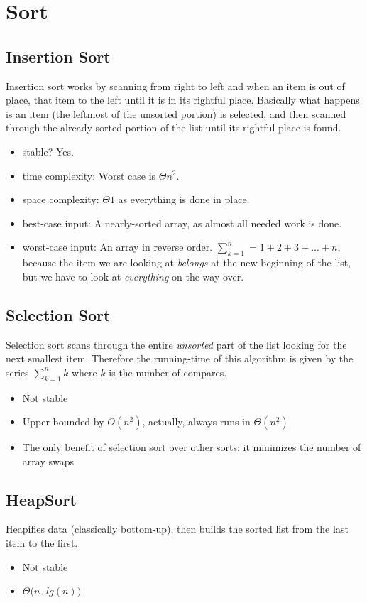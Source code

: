 \documentclass[12pt, letterpaper]{article}
\begin{document}
\section{Sort}
\subsection{Insertion Sort}
Insertion sort works by scanning from right to left and when an item is out of place,  that item to the left until it is in its rightful place.
\newline \newline \noindent
Basically what happens is an item (the leftmost of the unsorted portion) is selected, and then scanned through the already sorted portion of the list until its rightful place is found.
\begin{itemize}
\item stable? Yes.
\item time complexity:
Worst case is $\Theta n^2$.
\item space complexity: 
$\Theta 1$ as everything is done in place.
\item best-case input:
A nearly-sorted array, as almost all needed work is done. 
\item worst-case input: An array in reverse order. $\sum_{k=1}^{n} = 1 + 2 + 3 + ... + n$, because the item we are looking at \textit{belongs} at the new beginning of the list, but we have to look at \textit{everything} on the way over.
\end{itemize}
\subsection{Selection Sort}
Selection sort scans through the entire \emph{unsorted} part of the list looking for the next smallest item. Therefore the running-time of this algorithm is given by the series $\sum_{k=1}^n k$ where $k$ is the number of compares.
\begin{itemize}
\item Not stable
\item Upper-bounded by $O(n^2)$, actually, always runs in $\Theta(n^2)$
\item The only benefit of selection sort over other sorts: it minimizes the number of array swaps
\end{itemize}
\subsection{HeapSort}
Heapifies data (classically bottom-up), then builds the sorted list from the last item to the first.
\begin{itemize}
\item Not stable
\item $\Theta\big(n\cdot lg(n)\big)$
\end{itemize}
\end{document}
